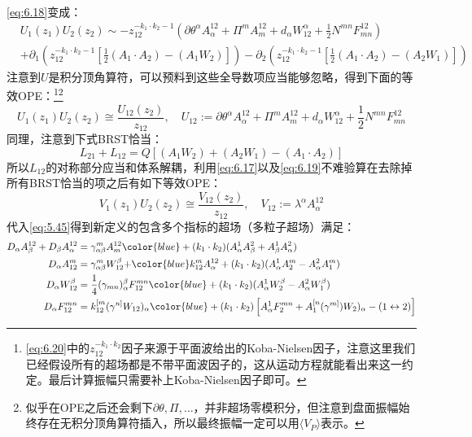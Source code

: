 \ref{eq:6.18}变成：
\begin{equation}
	\label{eq:6.20}
	\begin{aligned}
		&U_1(z_1)U_2(z_2)\sim-z_{12}^{-k_1\cdot k_2-1}\left(\partial\theta^\alpha A_\alpha^{12}+\Pi^mA_m^{12}+d_\alpha W_{12}^\alpha+\frac{1}{2}N^{mn}F_{mn}^{12}\right)\\&+\partial_1\left(z_{12}^{-k_1\cdot k_2-1}\left[\frac{1}{2}(A_1\cdot A_2)-(A_1W_2)\right]\right)-\partial_2\left(z_{12}^{-k_1\cdot k_2-1}\left[\frac{1}{2}(A_1\cdot A_2)-(A_2W_1)\right]\right)
	\end{aligned}
\end{equation}
注意到$U$是积分顶角算符，可以预料到这些全导数项应当能够忽略，得到下面的等效OPE：\footnote{\ref{eq:6.20}中的$z_{12}^{-k_1\cdot k_2}$因子来源于平面波给出的Koba-Nielsen因子，注意这里我们已经假设所有的超场都是不带平面波因子的，这从运动方程就能看出来这一约定。最后计算振幅只需要补上Koba-Nielsen因子即可。}\footnote{似乎在OPE之后还会剩下$\partial\theta,\Pi,\ldots$，并非超场零模积分，但注意到盘面振幅始终存在无积分顶角算符插入，所以最终振幅一定可以用$\langle V_P\rangle$表示。}
\begin{equation}
	U_1(z_1)U_2(z_2)\cong \frac{U_{12}(z_2)}{z_{12}}, \quad U_{12}:=\partial\theta^\alpha A_\alpha^{12}+\Pi^mA_m^{12}+d_\alpha W_{12}^\alpha+\frac{1}{2}N^{mn}F_{mn}^{12}
\end{equation}
同理，注意到下式BRST恰当：
\begin{equation}
	L_{21}+L_{12}=Q\left[(A_1W_2)+(A_2W_1)-(A_1\cdot A_2)\right]
\end{equation}
所以$L_{12}$的对称部分应当和体系解耦，利用\ref{eq:6.17}以及\ref{eq:6.19}不难验算在去除掉所有BRST恰当的项之后有如下等效OPE：
\begin{equation}
	V_1(z_1)U_2(z_2)\cong \frac{V_{12}(z_2)}{z_{12}},\quad
	V_{12} := \lambda^\alpha A_\alpha^{12}
\end{equation}
代入\ref{eq:5.45}得到新定义的包含多个指标的超场（多粒子超场）满足：
\begin{equation}
	\begin{aligned}
		D_\alpha A_\beta^{12}+D_\beta A_\alpha^{12}&=\gamma_{\alpha\beta}^mA_m^{12}{\color{blue}+(k_1\cdot k_2)(A_\alpha^1A_\beta^2+A_\beta^1A_\alpha^2)}
		\\D_\alpha A_{12}^m&=\gamma_{\alpha\beta}^mW_{12}^\beta{+\color{blue}k_{12}^mA_\alpha^{12}+(k_1\cdot k_2)(A_\alpha^1A_2^m-A_\alpha^2A_1^m)}
		\\D_\alpha W_{12}^\beta&=\frac{1}{4}(\gamma_{mn})_\alpha^\beta F_{12}^{mn}{\color{blue}+(k_1\cdot k_2)(A_\alpha^1W_2^\beta-A_\alpha^2W_1^\beta)}
		\\D_\alpha F_{12}^{mn}&=k_{12}^{[m}(\gamma^{n]}W_{12})_\alpha{\color{blue}+(k_1\cdot k_2)\left[A_\alpha^1F_2^{mn}+A_1^{[n}(\gamma^{m]})W_2)_\alpha-(1\leftrightarrow2)\right]}
	\end{aligned}
\end{equation}
